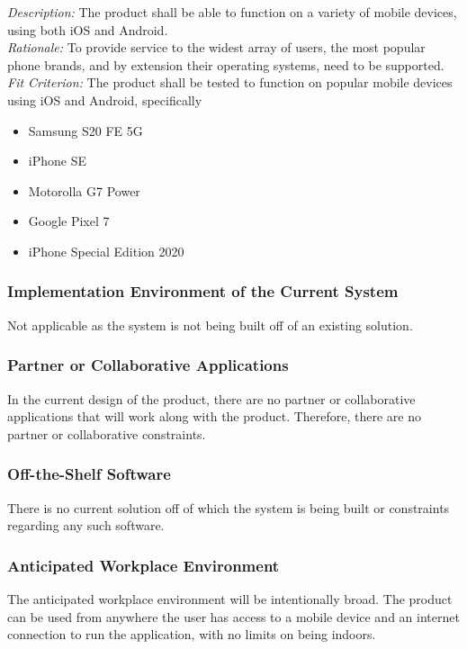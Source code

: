 \documentclass[12pt]{article}
\begin{document}
\noindent
\emph{Description:} The product shall be able to function on a variety of mobile devices, using both iOS and Android.\\
\emph{Rationale:} To provide service to the widest array of users, the most popular phone brands, and by extension their operating systems, need to be supported.\\
\emph{Fit Criterion:} The product shall be tested to function on popular mobile devices using iOS and Android, specifically 
\begin{itemize}
	\item Samsung S20 FE 5G
    \item iPhone SE
    \item Motorolla G7 Power
    \item Google Pixel 7
    \item iPhone Special Edition 2020
\end{itemize}

\subsubsection{Implementation Environment of the Current System}
Not applicable as the system is not being built off of an existing solution. 

\subsubsection{Partner or Collaborative Applications}
In the current design of the product, there are no partner or collaborative applications that will
work along with the product. Therefore, there are no partner or collaborative constraints.

\subsubsection{Off-the-Shelf Software}
There is no current solution off of which the system is being built or constraints regarding any such software. 

\subsubsection{Anticipated Workplace Environment}
The anticipated workplace environment will be intentionally broad. The product can be used from anywhere the user has access to a mobile device and an internet connection to run the application, with no limits on being indoors. 
\end{document}
